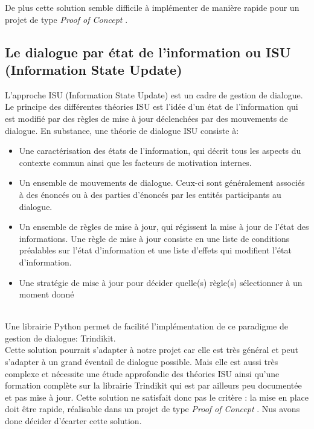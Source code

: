 De plus cette solution semble difficile à implémenter de manière rapide pour un projet de type \og \emph{Proof of Concept} \fg.

\FloatBarrier

\subsection{Le dialogue par état de l'information ou ISU (Information State Update)}

L'approche ISU (Information State Update) est un cadre de gestion de dialogue. Le principe des différentes théories ISU est l'idée d'un état de l'information qui est modifié par des règles de mise à jour déclenchées par des mouvements de dialogue. En substance, une théorie de dialogue ISU consiste à:
\begin{itemize}
	\item Une caractérisation des états de l'information, qui décrit tous les aspects du contexte commun ainsi que les facteurs de motivation internes.
	\item Un ensemble de mouvements de dialogue. Ceux-ci sont généralement associés à des énoncés ou à des parties d'énoncés par les entités participants au dialogue.
	\item Un ensemble de règles de mise à jour, qui régissent la mise à jour de l'état des informations. Une règle de mise à jour consiste en une liste de conditions préalables sur l'état d'information et une liste d'effets qui modifient l'état d'information.
	\item Une stratégie de mise à jour pour décider quelle(s) règle(s) sélectionner à un moment donné
\end{itemize}

~\\\indent
Une librairie Python permet de facilité l'implémentation de ce paradigme de gestion de dialogue: Trindikit. \\
Cette solution pourrait s'adapter à notre projet car elle est très général et peut s'adapter à un grand éventail de dialogue possible. Mais elle est aussi très complexe et nécessite une étude approfondie des théories ISU ainsi qu'une formation complète sur la librairie Trindikit qui est par ailleurs peu documentée et pas mise à jour. Cette solution ne satisfait donc pas le critère : \og la mise en place doit être rapide, réalisable dans un projet de type \textit{Proof of Concept} \fg. Nus avons donc décider d'écarter cette solution.



